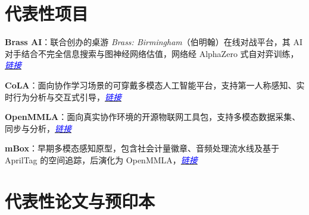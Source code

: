 \documentclass[11pt,letterpaper]{report}
\newcommand{\listitemspace}{0.25em}
\renewenvironment{itemize}
{\begin{list}{}{\setlength{\leftmargin}{0em}
                \setlength{\parskip}{0em}
                \setlength{\itemsep}{\listitemspace}
                \setlength{\parsep}{\listitemspace}}}
{\end{list}}
\begin{document}
    \section*{代表性项目}

    \begin{itemize}

        \item \textbf{Brass AI}：联合创办的桌游 \textit{Brass: Birmingham}（伯明翰）在线对战平台，其 AI 对手结合不完全信息搜索与图神经网络估值，网络经 AlphaZero 式自对弈训练，\href{https://brass.ucph-cola.org}{\textcolor{blue}{\textit{链接}}}
        \item \textbf{CoLA}：面向协作学习场景的可穿戴多模态人工智能平台，支持第一人称感知、实时行为分析与交互式引导，\href{https://ucph-cola.org}{\textcolor{blue}{\textit{链接}}}
        \item \textbf{OpenMMLA}：面向真实协作环境的开源物联网工具包，支持多模态数据采集、同步与分析，\href{https://github.com/ucph-ccs/OpenMMLA}{\textcolor{blue}{\textit{链接}}}
        \item \textbf{mBox}：早期多模态感知原型，包含社会计量徽章、音频处理流水线及基于 AprilTag 的空间追踪，后演化为 OpenMMLA，\href{https://github.com/ucph-ccs/mbox-uber}{\textcolor{blue}{\textit{链接}}}

    \end{itemize}


    \section*{代表性论文与预印本}
\end{document}
